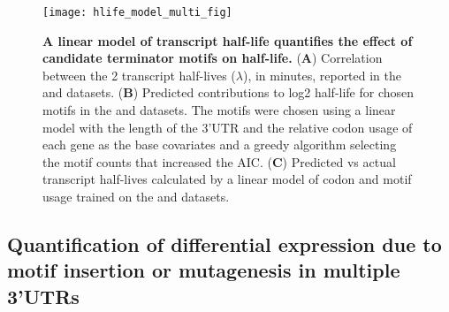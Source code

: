\documentclass[../main.tex]{subfiles}
\begin{document}
\begin{figure}[p]

{\centering \texttt{[image: hlife\_model\_multi\_fig]} 

}

\caption[A linear model of transcript half-life quantifies the effect of candidate terminator motifs on half-life.]{\textbf{A linear model of transcript half-life quantifies the effect of candidate terminator motifs on half-life.} (\textbf{A}) Correlation between the 2 transcript half-lives (\(\lambda\)), in minutes, reported in the \parencite{Chan2018} and \parencite{Sun2013} datasets. (\textbf{B}) Predicted contributions to log2 half-life for chosen motifs in the \parencite{Chan2018} and \parencite{Sun2013} datasets. The motifs were chosen using a linear model with the length of the 3’UTR and the relative codon usage of each gene as the base covariates and a greedy algorithm selecting the motif counts that increased the AIC. (\textbf{C}) Predicted vs actual transcript half-lives calculated by a linear model of codon and motif usage trained on the \parencite{Chan2018} and \parencite{Sun2013} datasets.}\label{fig:hlife-decay-model}
\end{figure}

\subsection{Quantification of differential expression due to motif insertion or mutagenesis in multiple 3'UTRs}
\end{document}
